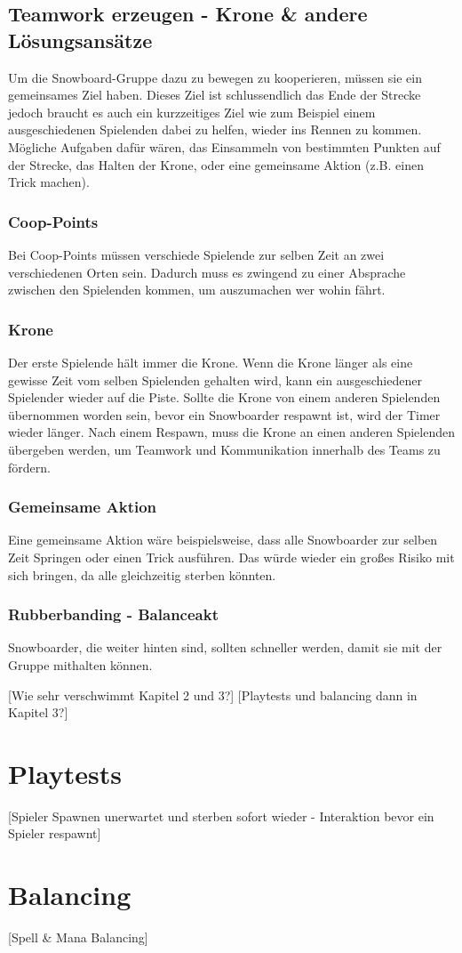 \subsection{Teamwork erzeugen - Krone \& andere Lösungsansätze\label{_teamwork_erzeugen}}
Um die Snowboard-Gruppe dazu zu bewegen zu kooperieren, müssen sie ein gemeinsames Ziel haben. Dieses Ziel ist schlussendlich das Ende der Strecke jedoch braucht es auch ein kurzzeitiges Ziel wie zum Beispiel einem ausgeschiedenen Spielenden dabei zu helfen, wieder ins Rennen zu kommen. Mögliche Aufgaben dafür wären, das Einsammeln von bestimmten Punkten auf der Strecke, das Halten der Krone, oder eine gemeinsame Aktion (z.B. einen Trick machen).

\subsubsection{Coop-Points}
Bei Coop-Points müssen verschiede Spielende zur selben Zeit an zwei verschiedenen Orten sein. Dadurch muss es zwingend zu einer Absprache zwischen den Spielenden kommen, um auszumachen wer wohin fährt.

\subsubsection{Krone\label{_krone}}
Der erste Spielende hält immer die Krone. Wenn die Krone länger als eine gewisse Zeit vom selben Spielenden gehalten wird, kann ein ausgeschiedener Spielender wieder auf die Piste. Sollte die Krone von einem anderen Spielenden übernommen worden sein, bevor ein Snowboarder respawnt ist, wird der Timer wieder länger. Nach einem Respawn, muss die Krone an einen anderen Spielenden übergeben werden, um Teamwork und Kommunikation innerhalb des Teams zu fördern.

\subsubsection{Gemeinsame Aktion}
Eine gemeinsame Aktion wäre beispielsweise, dass alle Snowboarder zur selben Zeit Springen oder einen Trick ausführen. Das würde wieder ein großes Risiko mit sich bringen, da alle gleichzeitig sterben könnten.

\subsubsection{Rubberbanding - Balanceakt}
Snowboarder, die weiter hinten sind, sollten schneller werden, damit sie mit der Gruppe mithalten können. 

[Wie sehr verschwimmt Kapitel 2 und 3?]
[Playtests und balancing dann in Kapitel 3?]

\section{Playtests}

[Spieler Spawnen unerwartet und sterben sofort wieder - Interaktion bevor ein Spieler respawnt]

\section{Balancing}

[Spell \& Mana Balancing]
